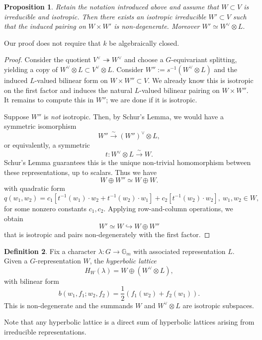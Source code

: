 \documentclass[12pt]{amsart}
\numberwithin{equation}{section}
\newcommand{\lra}{\longrightarrow}
\newcommand{\ra}{\rightarrow}
\newcommand{\bG}{\mathbb{G}}
\theoremstyle{plain}
\newtheorem{prop}{Proposition}[section]
\theoremstyle{definition}
\newtheorem{defi}[prop]{Definition}
\theoremstyle{remark}
\begin{document}
\begin{prop} \label{prop:getperp}
Retain the notation introduced above and assume that $W\subset V$ is irreducible and isotropic.
Then there exists an isotropic irreducible $W'\subset V$ such that the induced pairing on $W \times W'$
is non-degenerate. Moreover $W' \simeq W^{\vee}\otimes L.$
\end{prop}
Our proof does not require that $k$ be algebraically closed.
\begin{proof}
Consider the quotient 
$V^{\vee} \twoheadrightarrow W^{\vee}$
and choose a $G$-equivariant splitting, yielding a copy of $W^{\vee}\otimes L \subset V^{\vee}\otimes L$.  
Consider $W'':=s^{-1}(W^{\vee}\otimes L)$ and the induced $L$-valued bilinear form on 
$W \times W'' \subset V$. We already know this is isotropic on the first factor and
induces the natural $L$-valued bilinear pairing on $W \times W''$. It remains to compute this in
$W''$; we are done if it is isotropic.

Suppose $W''$ is {\em not} isotropic. Then, by Schur's Lemma, we would have a symmetric isomorphism
$$W'' \stackrel{\sim}{\lra} (W'')^{\vee}\otimes L,$$
or equivalently, a symmetric
$$t:W^{\vee} \otimes L \stackrel{\sim}{\lra} W.$$
Schur's Lemma guarantees this is the unique non-trivial homomorphism between these representations, up to scalars.  
Thus we have
$$W \oplus W'' \simeq W \oplus W.$$
with quadratic form
$$q(w_1,w_2) = c_1[t^{-1}(w_1)\cdot w_2 + t^{-1}(w_2)\cdot w_1] + c_2 [t^{-1}(w_2)\cdot w_2], \ w_1,w_2 \in W,$$
for some nonzero constants $c_1,c_2$.  Applying row-and-column operations, we obtain
$$W' \simeq W \hookrightarrow W \oplus W''$$
that is isotropic and pairs non-degenerately with the first factor.  
\end{proof}



\begin{defi} \label{defi:hyp}
Fix a character $\lambda:G \ra \bG_m$ with associated representation $L$. Given a $G$-representation $W$,
the {\em hyperbolic lattice}
$$H_W(\lambda) = W \oplus (W^{\vee}\otimes L),$$
with bilinear form 
$$b(w_1,f_1;w_2,f_2)=\frac{1}{2}(f_1(w_2)+ f_2(w_1)).$$ 
This is non-degenerate and the summands $W$ and $W^{\vee}\otimes L$
are isotropic subspaces.  
\end{defi}
Note that any hyperbolic lattice is a direct sum of hyperbolic lattices arising from irreducible representations.
\end{document}
